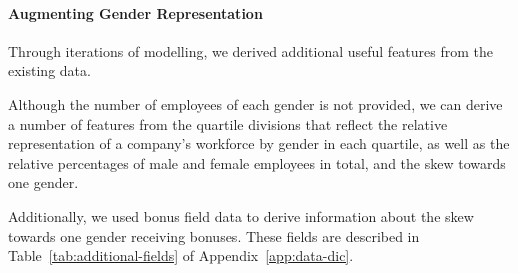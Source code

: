 \paragraph{Augmenting Gender Representation}
Through iterations of modelling, we derived additional useful features from the existing data.

Although the number of employees of each gender is not provided, we can derive a number of features from the quartile divisions that reflect the relative representation of a company's workforce by gender in each quartile, as well as the relative percentages of male and female employees in total, and the skew towards one gender.

Additionally, we used bonus field data to derive information about the skew towards one gender receiving bonuses.
These fields are described in Table\ \ref{tab:additional-fields} of Appendix\ \ref{app:data-dic}. 


